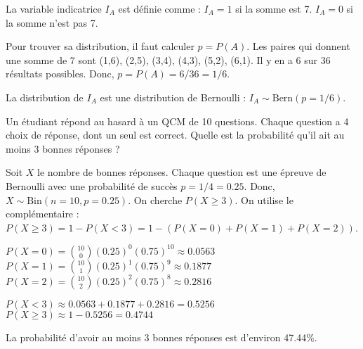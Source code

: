 \begin{correctionbox}
La variable indicatrice $I_A$ est définie comme :
$I_A = 1$ si la somme est 7.
$I_A = 0$ si la somme n'est pas 7.

Pour trouver sa distribution, il faut calculer $p = P(A)$. Les paires qui donnent une somme de 7 sont (1,6), (2,5), (3,4), (4,3), (5,2), (6,1). Il y en a 6 sur 36 résultats possibles.
Donc, $p = P(A) = 6/36 = 1/6$.

La distribution de $I_A$ est une distribution de Bernoulli : $I_A \sim \text{Bern}(p=1/6)$.
\end{correctionbox}

\begin{exercicebox}
Un étudiant répond au hasard à un QCM de 10 questions. Chaque question a 4 choix de réponse, dont un seul est correct. Quelle est la probabilité qu'il ait au moins 3 bonnes réponses ?
\end{exercicebox}

\begin{correctionbox}
Soit $X$ le nombre de bonnes réponses. Chaque question est une épreuve de Bernoulli avec une probabilité de succès $p = 1/4 = 0.25$. Donc, $X \sim \text{Bin}(n=10, p=0.25)$.
On cherche $P(X \ge 3)$. On utilise le complémentaire : $P(X \ge 3) = 1 - P(X < 3) = 1 - (P(X=0) + P(X=1) + P(X=2))$.

$P(X=0) = \binom{10}{0}(0.25)^0(0.75)^{10} \approx 0.0563$
$P(X=1) = \binom{10}{1}(0.25)^1(0.75)^9 \approx 0.1877$
$P(X=2) = \binom{10}{2}(0.25)^2(0.75)^8 \approx 0.2816$

$P(X < 3) \approx 0.0563 + 0.1877 + 0.2816 = 0.5256$
$P(X \ge 3) \approx 1 - 0.5256 = 0.4744$

La probabilité d'avoir au moins 3 bonnes réponses est d'environ 47.44\%.
\end{correctionbox}